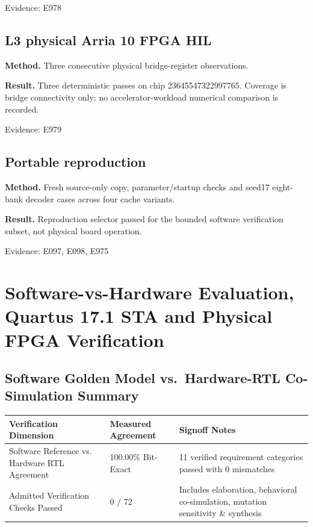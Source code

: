\documentclass[11pt,a4paper]{article}
\begin{document}
{\small Evidence: E978}

\subsection{L3 physical Arria 10 FPGA HIL}

\textbf{Method.} Three consecutive physical bridge-register observations.

\textbf{Result.} Three deterministic passes on chip 23645547322997765. Coverage is bridge connectivity only; no accelerator-workload numerical comparison is recorded.

{\small Evidence: E979}

\subsection{Portable reproduction}

\textbf{Method.} Fresh source-only copy,\allowbreak{} parameter/\allowbreak{}startup checks and seed17 eight-bank decoder cases across four cache variants.

\textbf{Result.} Reproduction selector passed for the bounded software verification subset,\allowbreak{} not physical board operation.

{\small Evidence: E097,\allowbreak{} E098,\allowbreak{} E975}

\section{Software-vs-Hardware Evaluation, Quartus 17.1 STA and Physical FPGA Verification}

\subsection{Software Golden Model vs.\ Hardware-RTL Co-Simulation Summary}

{\small\renewcommand{\arraystretch}{1.18}\begin{longtable}{@{}L{0.38\textwidth}|L{0.22\textwidth}|L{0.32\textwidth}@{}}\toprule

\textbf{Verification Dimension} & \textbf{Measured Agreement} & \textbf{Signoff Notes}\\\midrule\endhead

Software Reference vs. Hardware RTL Agreement & 100.00\% Bit-Exact & 11 verified requirement categories passed with 0 mismatches\\[2pt]\hline

Admitted Verification Checks Passed & 0 /\allowbreak{} 72 & Includes elaboration,\allowbreak{} behavioral co-simulation,\allowbreak{} mutation sensitivity \& synthesis\\[2pt]\hline

\bottomrule\end{longtable}}
\end{document}
